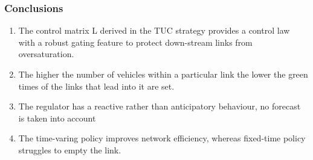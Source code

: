 \documentclass{beamer}
\begin{document}
\begin{frame}
\frametitle{Conclusions}
\begin{enumerate} 
\item  The control matrix L derived in the TUC strategy provides a control law with a robust gating feature to protect down-stream links from oversaturation. 
\item The higher the number of vehicles within a particular link the lower the green times of the links that lead into it are set.
\item The regulator has a reactive rather than anticipatory behaviour, no forecast is taken into account
\item The time-varing policy improves network efficiency, whereas fixed-time policy struggles to empty the link.

 \end{enumerate}


\end{frame}
\end{document}
